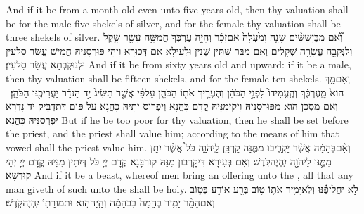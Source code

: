 {And if it be from a month old even unto five years old, then thy valuation shall be for the male five shekels of silver, and for the female thy valuation shall be three shekels of silver.}{}
{וְ֠אִ֠ם מִבֶּן\maqqaf שִׁשִּׁ֨ים שָׁנָ֤ה וָמַ֙עְלָה֙ אִם\maqqaf זָכָ֔ר וְהָיָ֣ה עֶרְכְּךָ֔ חֲמִשָּׁ֥ה עָשָׂ֖ר שָׁ֑קֶל וְלַנְּקֵבָ֖ה עֲשָׂרָ֥ה שְׁקָלִֽים׃}
{וְאִם מִבַּר שִׁתִּין שְׁנִין וּלְעֵילָא אִם דְּכוּרָא וִיהֵי פּוּרְסָנֵיהּ חֲמֵישׁ עֲשַׂר סִלְעִין וּלְנוּקְבְּתָא עֲשַׂר סִלְעִין׃}
{And if it be from sixty years old and upward: if it be a male, then thy valuation shall be fifteen shekels, and for the female ten shekels.}{}
{וְאִם\maqqaf מָ֥ךְ הוּא֙ מֵֽעֶרְכֶּ֔ךָ וְהֶֽעֱמִידוֹ֙ לִפְנֵ֣י הַכֹּהֵ֔ן וְהֶעֱרִ֥יךְ אֹת֖וֹ הַכֹּהֵ֑ן עַל\maqqaf פִּ֗י אֲשֶׁ֤ר תַּשִּׂיג֙ יַ֣ד הַנֹּדֵ֔ר יַעֲרִיכֶ֖נּוּ הַכֹּהֵֽן׃ \setuma }
{וְאִם מִסְכֵּן הוּא מִפּוּרְסָנֵיהּ וִיקִימִנֵּיהּ קֳדָם כָּהֲנָא וְיִפְרוֹס יָתֵיהּ כָּהֲנָא עַל פּוֹם דְּתַדְבֵּיק יַד נָדְרָא יִפְרְסִנֵּיהּ כָּהֲנָא׃}
{But if he be too poor for thy valuation, then he shall be set before the priest, and the priest shall value him; according to the means of him that vowed shall the priest value him.}{}
{וְאִ֨ם\maqqaf בְּהֵמָ֔ה אֲשֶׁ֨ר יַקְרִ֧יבוּ מִמֶּ֛נָּה קׇרְבָּ֖ן לַֽיהֹוָ֑ה כֹּל֩ אֲשֶׁ֨ר יִתֵּ֥ן מִמֶּ֛נּוּ לַיהֹוָ֖ה יִֽהְיֶה\maqqaf קֹּֽדֶשׁ׃}
{וְאִם בְּעִירָא דִּיקָרְבוּן מִנַּהּ קוּרְבָּנָא קֳדָם יְיָ כֹּל דְּיִתֵּין מִנֵּיהּ קֳדָם יְיָ יְהֵי קוּדְשָׁא׃}
{And if it be a beast, whereof men bring an offering unto the \lord, all that any man giveth of such unto the \lord\space shall be holy.}{}
{לֹ֣א יַחֲלִיפֶ֗נּוּ וְלֹֽא\maqqaf יָמִ֥יר אֹת֛וֹ ט֥וֹב בְּרָ֖ע אוֹ\maqqaf רַ֣ע בְּט֑וֹב וְאִם\maqqaf הָמֵ֨ר יָמִ֤יר בְּהֵמָה֙ בִּבְהֵמָ֔ה וְהָֽיָה\maqqaf ה֥וּא וּתְמוּרָת֖וֹ יִֽהְיֶה\maqqaf קֹּֽדֶשׁ׃}
